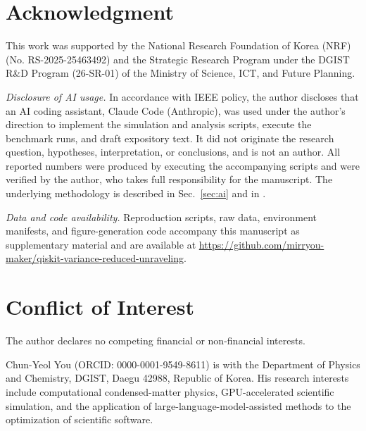 \documentclass{ieeeaccess}
\begin{document}
\section*{Acknowledgment}
This work was supported by the National Research Foundation of Korea (NRF)
(No. RS-2025-25463492) and the Strategic Research Program under the DGIST R\&D Program
(26-SR-01) of the Ministry of Science, ICT, and Future Planning.

\emph{Disclosure of AI usage.} In accordance with IEEE policy, the author discloses that an AI
coding assistant, Claude Code (Anthropic), was used under the author's direction to implement the
simulation and analysis scripts, execute the benchmark runs, and draft expository text. It did not
originate the research question, hypotheses, interpretation, or conclusions, and is not an author.
All reported numbers were produced by executing the accompanying scripts and were verified by the
author, who takes full responsibility for the manuscript. The underlying methodology is described in
Sec.~\ref{sec:ai} and in \cite{you2026mumax,you2026lammps}.

\emph{Data and code availability.} Reproduction scripts, raw data, environment manifests, and
figure-generation code accompany this manuscript as supplementary material and are available
at \url{https://github.com/mirryou-maker/qiskit-variance-reduced-unraveling}.

\section*{Conflict of Interest}
The author declares no competing financial or non-financial interests.




\begin{IEEEbiographynophoto}{Chun-Yeol You}
(ORCID: 0000-0001-9549-8611) is with the Department of Physics and Chemistry, DGIST, Daegu 42988,
Republic of Korea. His research interests include computational condensed-matter physics,
GPU-accelerated scientific simulation, and the application of large-language-model-assisted methods
to the optimization of scientific software.
\end{IEEEbiographynophoto}

\EOD
\end{document}
